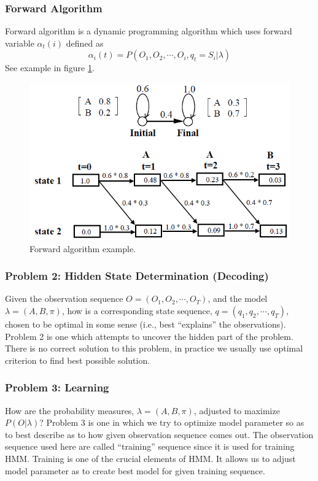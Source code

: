 \documentclass[12pt, a4paper, twoside]{report}
\begin{document}
\subsubsection{Forward Algorithm}
Forward algorithm is a dynamic programming algorithm which uses forward variable $\alpha_t(i)$ defined as
\begin{equation*}
\alpha_i(t) = P(O_1,O_2, \cdots,O_i, q_t = S_i|\lambda)
\end{equation*}
See example in figure \ref{fig:forward-eg}.
\begin{figure}[!h]
	\centering
	\includegraphics[width=1\textwidth]
	{images/chapter4/forward-eg}
	\caption{Forward algorithm example.}
	\label{fig:forward-eg}
\end{figure}

\subsubsection{Problem 2: Hidden State Determination (Decoding)}
Given the observation sequence $O = (O_1, O_2, \cdots,O_T)$, and the model $\lambda = (A,B, \pi)$, how is a corresponding state sequence, $q = (q_1, q_2, \cdots , q_T )$, chosen to be optimal in some sense (i.e., best ``explains'' the observations). Problem 2 is one which attempts to uncover the hidden part of the problem. There is no correct solution to this problem, in practice we usually use optimal criterion to find best possible solution.
\subsubsection{Problem 3: Learning}
How are the probability measures, $\lambda = (A,B, \pi)$, adjusted to maximize $P (O|\lambda)$? Problem 3 is one in which we try to optimize model parameter so as to best describe as to how given observation sequence comes out. The observation sequence used here are called ``training'' sequence since it is used for training HMM. Training is one of the crucial elements of HMM. It allows us to adjust model parameter as to create best model for given training sequence.
\end{document}

